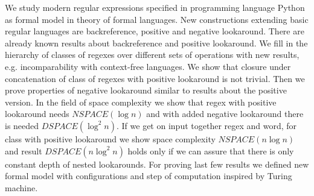 \null
We study modern regular expressions specified in programming language Python as formal model in theory of formal languages. New constructions extending basic regular languages are backreference, positive and negative lookaround. There are already known results about backreference and positive lookaround. We fill in the hierarchy of classes of regexes over different sets of operations with new results, e.g. incomparability with context-free languages. We show that closure under concatenation of class of regexes with positive lookaround is not trivial. Then we prove properties of negative lookaround similar to results about the positive version. In the field of space complexity we show that regex with positive lookaround needs $NSPACE(\log n)$ and with added negative lookaround there is needed $DSPACE(\log^2 n)$. If we get on input together regex and word, for class with positive lookaround we show space complexity $NSPACE(n\log n)$ and result $DSPACE(n\log^2 n)$ holds only if we can assure that there is only constant depth of nested lookarounds. For proving last few results we defined new formal model with configurations and step of computation inspired by Turing machine.